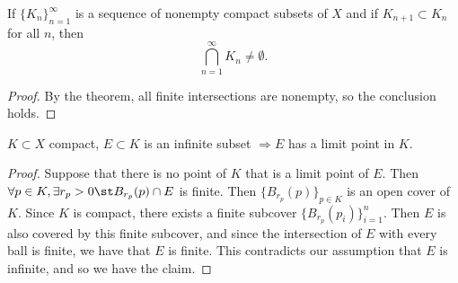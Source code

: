 \documentclass{notes}
\begin{document}
\begin{corollary}
  If $\{K_n\}^\infty_{n=1}$ is a sequence of nonempty compact subsets of $X$ and if $K_{n+1}\subset 
  K_n$ for all $n$, then $$\bigcap_{n=1}^\infty K_n \neq \emptyset.$$
\end{corollary}
\begin{proof}
  By the theorem, all finite intersections are nonempty, so the conclusion holds.
\end{proof}

\begin{corollary}
  $K\subset X$ compact, $E\subset K$ is an infinite subset $\Rightarrow E$ has a limit point in $K$.
\end{corollary}
\begin{proof}
  Suppose that there is no point of $K$ that is a limit point of $E$. Then $\forall p\in K, \exists
  r_p >0 \st B_{r_p}(p) \cap E$ is finite. Then $\{B_{r_p}(p)\}_{p\in K}$ is an open cover of $K$. 
  Since $K$ is compact, there exists a finite subcover $\{B_{r_p}(p_i)\}_{i=1}^n$. Then $E$ is also
  covered by this finite subcover, and since the intersection of $E$ with every ball is finite, we 
  have that $E$ is finite. This contradicts our assumption that $E$ is infinite, and so we have the claim.
\end{proof}
\end{document}
